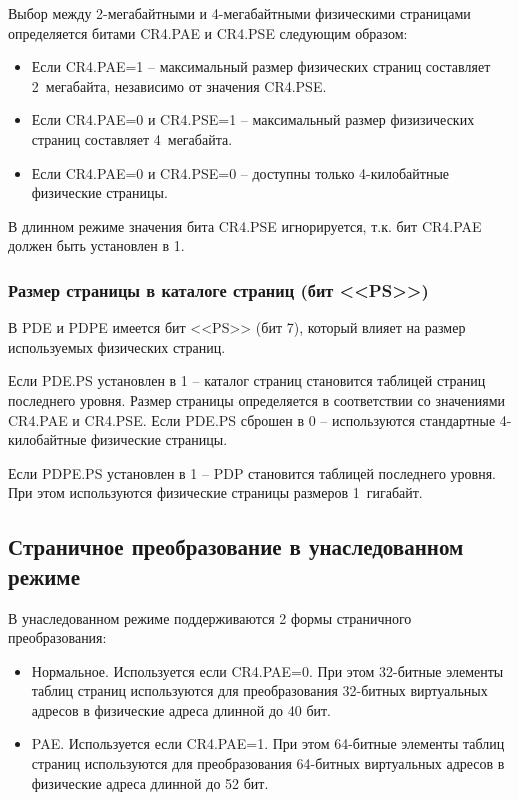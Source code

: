 Выбор между 2-мегабайтными и 4-мегабайтными физическими страницами определяется битами CR4.PAE и CR4.PSE
следующим образом:
\begin{itemize}
\item Если CR4.PAE=1 -- максимальный размер физических страниц составляет 2~мегабайта, независимо от значения CR4.PSE.
\item Если CR4.PAE=0 и CR4.PSE=1 -- максимальный размер физизических страниц составляет 4~мегабайта.
\item Если CR4.PAE=0 и CR4.PSE=0 -- доступны только 4-килобайтные физические страницы.
\end{itemize}

В длинном режиме значения бита CR4.PSE игнорируется, т.к. бит CR4.PAE должен быть установлен в 1.

\subsubsection*{Размер страницы в каталоге страниц (бит <<PS>>)}
В PDE и PDPE имеется бит <<PS>> (бит 7), который влияет на размер используемых физических страниц.

Если PDE.PS установлен в 1 -- каталог страниц становится таблицей страниц последнего уровня.
Размер страницы определяется в соответствии со значениями CR4.PAE и CR4.PSE. Если PDE.PS сброшен в 0 --
используются стандартные 4-килобайтные физические страницы.

Если PDPE.PS установлен в 1 -- PDP становится таблицей последнего уровня.
При этом используются физические страницы размеров 1~гигабайт.

\subsection{Страничное преобразование в унаследованном режиме}
В унаследованном режиме поддерживаются 2 формы страничного преобразования:
\begin{itemize}
\item Нормальное. Используется если CR4.PAE=0. При этом 32-битные элементы таблиц страниц
	используются для преобразования 32-битных виртуальных адресов в физические адреса длинной до 40 бит.
\item PAE. Используется если CR4.PAE=1. При этом 64-битные элементы таблиц страниц используются
	для преобразования 64-битных виртуальных адресов в физические адреса длинной до 52 бит.
\end{itemize}

